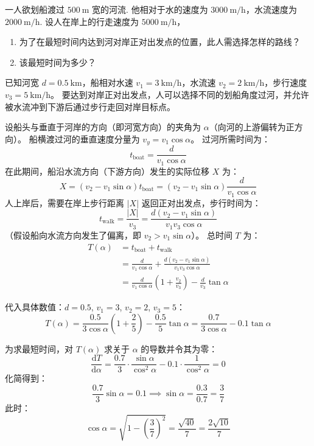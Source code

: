 \begin{exercise}\label{ex:2.15}
一人欲划船渡过 $500 \ \mathrm{m}$ 宽的河流. 他相对于水的速度为 $3000 \ \mathrm{m/h}$，水流速度为 $2000 \ \mathrm{m/h}$. 设人在岸上的行走速度为 $5000 \ \mathrm{m/h}$，
\begin{enumerate}
  \item[(a)] 为了在最短时间内达到河对岸正对出发点的位置，此人需选择怎样的路线？
  \item[(b)] 该最短时间为多少？
\end{enumerate}
\end{exercise}
\begin{solution}
已知河宽 $d = 0.5 \ \mathrm{km}$，船相对水速 $v_1 = 3 \ \mathrm{km/h}$，水流速 $v_2 = 2 \ \mathrm{km/h}$，步行速度 $v_3 = 5 \ \mathrm{km/h}$。
要达到对岸正对出发点，人可以选择不同的划船角度过河，并允许被水流冲到下游后通过步行走回对岸目标点。

设船头与垂直于河岸的方向（即河宽方向）的夹角为 $\alpha$（向河的上游偏转为正方向）。
船横渡过河的垂直速度分量为 $v_y = v_1 \cos\alpha$。
过河所需时间为：
$$ t_{\text{boat}} = \frac{d}{v_1 \cos\alpha} $$
在此期间，船沿水流方向（下游方向）发生的实际位移 $X$ 为：
$$ X = (v_2 - v_1 \sin\alpha) t_{\text{boat}} = (v_2 - v_1 \sin\alpha) \frac{d}{v_1 \cos\alpha} $$
人上岸后，需要在岸上步行距离 $|X|$ 返回正对出发点，步行时间为：
$$ t_{\text{walk}} = \frac{|X|}{v_3} = \frac{d(v_2 - v_1 \sin\alpha)}{v_1 v_3 \cos\alpha} $$
（假设船向水流方向发生了偏离，即 $v_2 > v_1 \sin\alpha$）。
总时间 $T$ 为：
\begin{align*}
T(\alpha) &= t_{\text{boat}} + t_{\text{walk}} \\
          &= \frac{d}{v_1 \cos\alpha} + \frac{d(v_2 - v_1 \sin\alpha)}{v_1 v_3 \cos\alpha} \\
          &= \frac{d}{v_1 \cos\alpha} \left( 1 + \frac{v_2}{v_3} \right) - \frac{d}{v_3} \tan\alpha
\end{align*}

代入具体数值：$d = 0.5$, $v_1 = 3$, $v_2 = 2$, $v_3 = 5$：
$$ T(\alpha) = \frac{0.5}{3 \cos\alpha} \left( 1 + \frac{2}{5} \right) - \frac{0.5}{5} \tan\alpha = \frac{0.7}{3 \cos\alpha} - 0.1 \tan\alpha $$

为求最短时间，对 $T(\alpha)$ 求关于 $\alpha$ 的导数并令其为零：
$$ \frac{\mathrm{d}T}{\mathrm{d}\alpha} = \frac{0.7}{3} \cdot \frac{\sin\alpha}{\cos^2\alpha} - 0.1 \cdot \frac{1}{\cos^2\alpha} = 0 $$
化简得到：
$$ \frac{0.7}{3} \sin\alpha = 0.1 \implies \sin\alpha = \frac{0.3}{0.7} = \frac{3}{7} $$
此时：
$$ \cos\alpha = \sqrt{1 - \left(\frac{3}{7}\right)^2} = \frac{\sqrt{40}}{7} = \frac{2\sqrt{10}}{7} $$


\end{solution}
